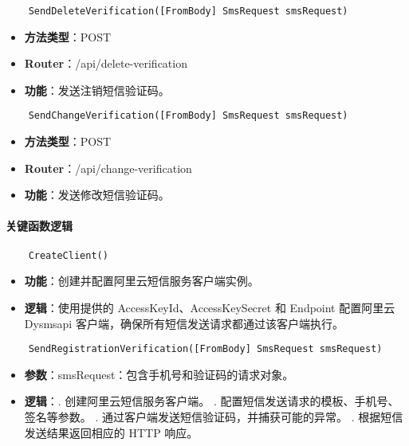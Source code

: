 \begin{verbatim}
	SendDeleteVerification([FromBody] SmsRequest smsRequest)
\end{verbatim}

\begin{itemize}
	\item \textbf{方法类型}：POST
	\item \textbf{Router}：/api/delete-verification
	\item \textbf{功能}：发送注销短信验证码。
\end{itemize}

\begin{verbatim}
	SendChangeVerification([FromBody] SmsRequest smsRequest)
\end{verbatim}

\begin{itemize}
	\item \textbf{方法类型}：POST
	\item \textbf{Router}：/api/change-verification
	\item \textbf{功能}：发送修改短信验证码。
\end{itemize}

\paragraph{关键函数逻辑}

\begin{verbatim}
	CreateClient()
\end{verbatim}

\begin{itemize}
	\item \textbf{功能}：创建并配置阿里云短信服务客户端实例。
	\item \textbf{逻辑}：使用提供的 AccessKeyId、AccessKeySecret 和 Endpoint 配置阿里云 Dysmsapi 客户端，确保所有短信发送请求都通过该客户端执行。
\end{itemize}

\begin{verbatim}
	SendRegistrationVerification([FromBody] SmsRequest smsRequest)
\end{verbatim}

\begin{itemize}
	\item \textbf{参数}：smsRequest：包含手机号和验证码的请求对象。
	\item \textbf{逻辑}：. 创建阿里云短信服务客户端。 . 配置短信发送请求的模板、手机号、签名等参数。 . 通过客户端发送短信验证码，并捕获可能的异常。 . 根据短信发送结果返回相应的 HTTP 响应。
\end{itemize}

